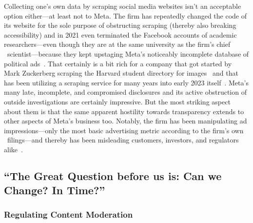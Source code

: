Collecting one's own data by scraping social media websites isn't an acceptable
option either---at least not to Meta. The firm has repeatedly changed the code
of its website for the sole purpose of obstructing scraping (thereby also
breaking accessibility) and in 2021 even terminated the Facebook accounts of
academic researchers---even though they are at the same university as the firm's
chief \AI\ scientist---because they kept upstaging Meta's noticeably incomplete
database of political
ads~\cite{EdelsonMcCoy2021a,Faife2021a,MerrillTobin2019,Roose2021a}. That
certainly is a bit rich for a company that got started by Mark Zuckerberg
scraping the Harvard student directory for images~\cite{Madrigal2019} and that
has been utilizing a scraping service for many years into early 2023
itself~\cite{Newman2023}. Meta's many late, incomplete, and compromised
disclosures and its active obstruction of outside investigations are certainly
impressive. But the most striking aspect about them is that the same apparent
hostility towards transparency extends to other aspects of Meta's business too.
Notably, the firm has been manipulating ad impressions---only the most basic
advertising metric according to the firm's own \SEC\ filings---and thereby has
been misleading customers, investors, and regulators alike~\cite{Grimm2022a}.


\let\Oldthefootnote\thefootnote
\renewcommand*{\thefootnote}{\ding{164}}
\subsection{``The Great Question before us is: Can we Change? In Time?''%
\texorpdfstring{\>\!\protect\footnotemark}{}}
\let\thefootnote\Oldthefootnote

\subsubsection{Regulating Content Moderation}
\label{sec:regulating:moderation}

